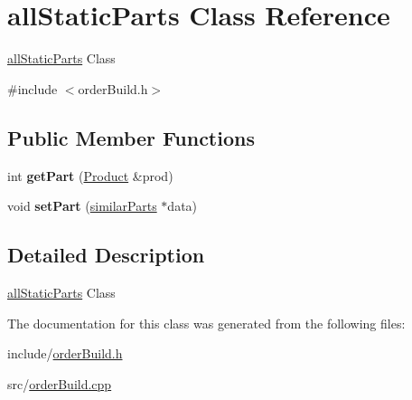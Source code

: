 \hypertarget{classallStaticParts}{}\section{all\+Static\+Parts Class Reference}
\label{classallStaticParts}


\hyperlink{classallStaticParts}{all\+Static\+Parts} Class  




{\ttfamily \#include $<$order\+Build.\+h$>$}

\subsection*{Public Member Functions}
\begin{DoxyCompactItemize}
\item 
\mbox{\label{classallStaticParts_afcf48c7e1aacab3554bdc767e536d02b}} 
int {\bfseries get\+Part} (\hyperlink{structProduct}{Product} \&prod)
\item 
\mbox{\label{classallStaticParts_aaf0ad01ce61050e4f1f91cd25ef13dc8}} 
void {\bfseries set\+Part} (\hyperlink{structsimilarParts}{similar\+Parts} $\ast$data)
\end{DoxyCompactItemize}


\subsection{Detailed Description}
\hyperlink{classallStaticParts}{all\+Static\+Parts} Class 

The documentation for this class was generated from the following files\+:\begin{DoxyCompactItemize}
\item 
include/\hyperlink{orderBuild_8h}{order\+Build.\+h}\item 
src/\hyperlink{orderBuild_8cpp}{order\+Build.\+cpp}\end{DoxyCompactItemize}
